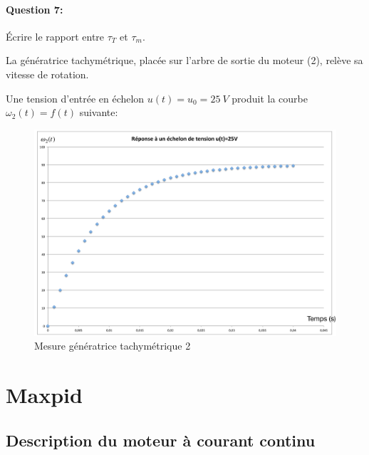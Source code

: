 \paragraph{Question 7:} Écrire le rapport entre $\tau_T$ et $\tau_m$.

La génératrice tachymétrique, placée sur l'arbre de sortie du moteur (2), relève sa vitesse de rotation.

Une tension d'entrée en échelon $u(t)=u_0=25\ V$ produit la courbe $\omega_2(t)=f(t)$ suivante:

\begin{figure}[!h]
 \centering\includegraphics[width=0.8\linewidth]{img/fig_moteur_charge_03}
  \caption{Mesure génératrice tachymétrique 2}
 \label{fig_moteur_charge_03}
\end{figure}

\newpage

\section{Maxpid}

\subsection{Description du moteur à courant continu}

